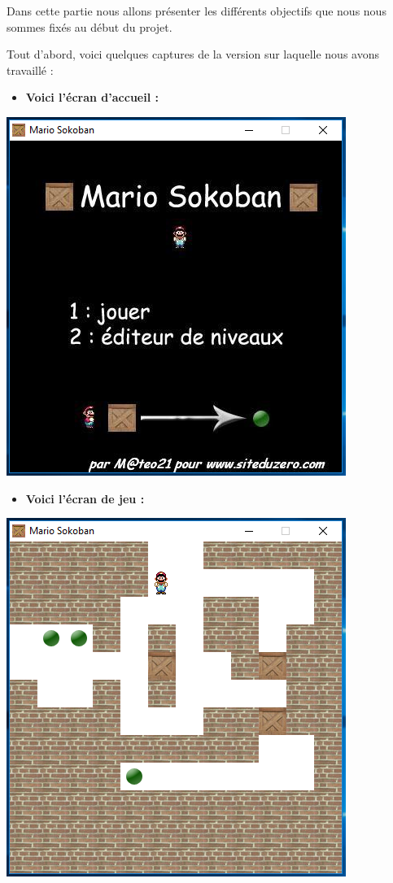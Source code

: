 \documentclass[english,11pt]{report}
\begin{document}
Dans cette partie nous allons présenter les différents objectifs que nous nous sommes fixés au début du projet.\par
Tout d'abord, voici quelques captures de la version sur laquelle nous avons travaillé :\par
\vspace{0.2cm}
\begin{itemize}[label=]
    \item{\textbf{Voici l'écran d'accueil :}}
\end{itemize}
\vspace{0.2cm}
%
\begin{center} 
\includegraphics[scale=0.75]{menuO}
\end{center}
%
\vspace{0.2cm}
\begin{itemize}[label=]
    \item{\textbf{Voici l'écran de jeu :}}
\end{itemize}
\vspace{0.2cm}
%
\begin{center} 
\includegraphics[scale=0.75]{jeuO}
\end{center}
\end{document}

